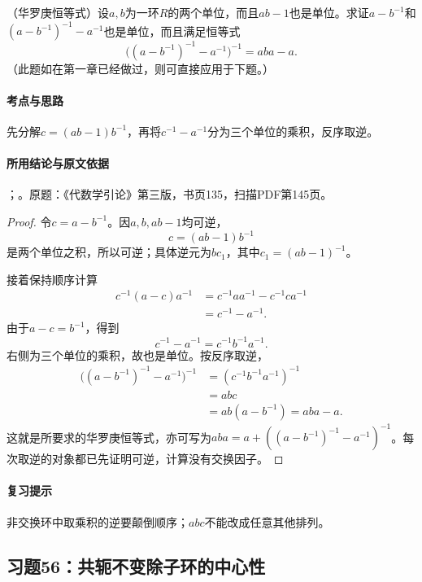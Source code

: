 （华罗庚恒等式）设$a,b$为一环$R$的两个单位，而且$ab-1$也是单位。求证$a-b^{-1}$和$(a-b^{-1})^{-1}-a^{-1}$也是单位，而且满足恒等式
\[
\bigl((a-b^{-1})^{-1}-a^{-1}\bigr)^{-1}=aba-a.
\]
（此题如在第一章已经做过，则可直接应用于下题。）

\paragraph{考点与思路}

先分解$c=(ab-1)b^{-1}$，再将$c^{-1}-a^{-1}$分为三个单位的乘积，反序取逆。

\paragraph{所用结论与原文依据}

；。原题：《代数学引论》第三版，书页135，扫描PDF第145页。


\begin{proof}

令$c=a-b^{-1}$。因$a,b,ab-1$均可逆，
\[
c=(ab-1)b^{-1}
\]
是两个单位之积，所以可逆；具体逆元为$bc_1$，其中$c_1=(ab-1)^{-1}$。

接着保持顺序计算
\begin{align*}
c^{-1}(a-c)a^{-1}
&=c^{-1}aa^{-1}-c^{-1}ca^{-1}\\
&=c^{-1}-a^{-1}.
\end{align*}
由于$a-c=b^{-1}$，得到
\[
c^{-1}-a^{-1}=c^{-1}b^{-1}a^{-1}.
\]
右侧为三个单位的乘积，故也是单位。按反序取逆，
\begin{align*}
\bigl((a-b^{-1})^{-1}-a^{-1}\bigr)^{-1}
&=(c^{-1}b^{-1}a^{-1})^{-1}\\
&=abc\\
&=ab(a-b^{-1})=aba-a.
\end{align*}
这就是所要求的华罗庚恒等式，亦可写为$aba=a+((a-b^{-1})^{-1}-a^{-1})^{-1}$。每次取逆的对象都已先证明可逆，计算没有交换因子。

\end{proof}

\paragraph{复习提示}

非交换环中取乘积的逆要颠倒顺序；$abc$不能改成任意其他排列。



\subsection{习题56：共轭不变除子环的中心性}

